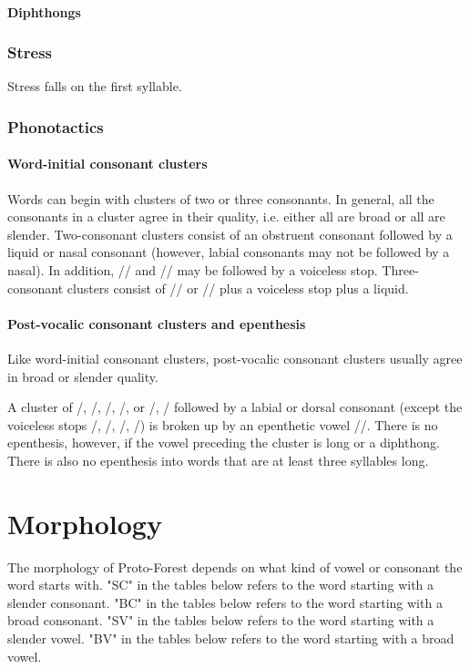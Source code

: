 \documentclass{article}
\begin{document}
\subsection{Diphthongs}
   
\section{Stress}
Stress falls on the first syllable.
\section{Phonotactics}
\subsection{Word-initial consonant clusters}
Words can begin with clusters of two or three consonants. In general, all the consonants in a cluster agree in their quality, i.e. either all are broad or all are slender. Two-consonant clusters consist of an obstruent consonant followed by a liquid or nasal consonant (however, labial consonants may not be followed by a nasal). In addition, // and // may be followed by a voiceless stop. Three-consonant clusters consist of // or // plus a voiceless stop plus a liquid.
\subsection{Post-vocalic consonant clusters and epenthesis}
Like word-initial consonant clusters, post-vocalic consonant clusters usually agree in broad or slender quality.

A cluster of /, /, /, /, or /, / followed by a labial or dorsal consonant (except the voiceless stops /, /, /, /) is broken up by an epenthetic vowel //. There is no epenthesis, however, if the vowel preceding the cluster is long or a diphthong. There is also no epenthesis into words that are at least three syllables long.
\newpage
\part{Morphology}
The morphology of Proto-Forest depends on what kind of vowel or consonant the word starts with. "SC" in the tables below refers to the word starting with a slender consonant. "BC" in the tables below refers to the word starting with a broad consonant. "SV" in the tables below refers to the word starting with a slender vowel. "BV" in the tables below refers to the word starting with a broad vowel.
\end{document}
